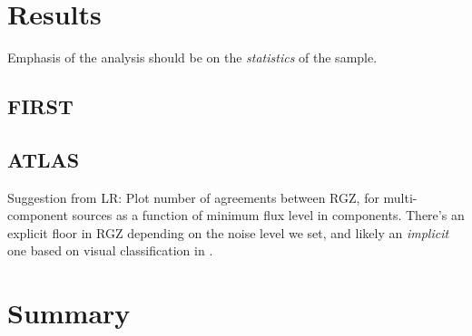 \documentclass[a4,useAMS,usenatbib]{mn2e}
\begin{document}
\section{Results}\label{sec:results}

Emphasis of the analysis should be on the \emph{statistics} of the sample.

\subsection{FIRST}\label{ssec:first}

\subsection{ATLAS}\label{ssec:atlas}

Suggestion from LR: Plot number of agreements between RGZ, \citet{nor06} for multi-component sources as a function of minimum flux level in components. There's an explicit floor in RGZ depending on the noise level we set, and likely an \emph{implicit} one based on visual classification in \citet{nor06}.


\section{Summary}\label{sec:summary}



\label{lastpage}
\end{document}
